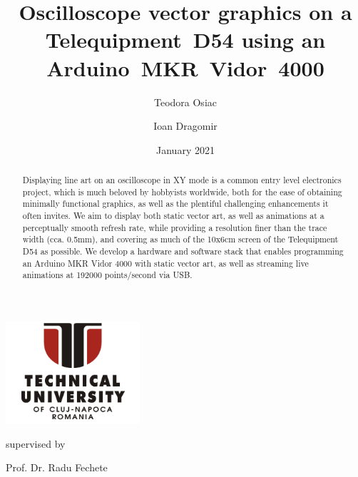\documentclass[12pt]{article}
\title{Oscilloscope vector graphics on a \mbox{Telequipment D54} using an \mbox{Arduino MKR Vidor 4000}}
\author{Teodora Osiac \and Ioan Dragomir}
\date{January 2021}
\begin{document}
\makeatletter
\renewcommand{\and}{\quad}
\begin{titlepage}
	\vspace*{\fill}
	\centering

	\makeatletter
	\centering{\LARGE\bfseries \@title \par} \vspace{1.5cm}

	\includegraphics[height=1.5in]{images/tucn-logo.jpg}\par

	\vspace{1.5cm}
	{\Large\@author \par}\vspace{0.45cm}

	{\large supervised by\par
	Prof. Dr. Radu Fechete}

	\vspace*{\fill}
	{\large \@date\par}
\end{titlepage}
\makeatother

\begin{abstract}
\noindent Displaying line art on an oscilloscope in XY mode is a common entry level electronics project, which is much beloved by hobbyists worldwide, both for the ease of obtaining minimally functional graphics, as well as the plentiful challenging enhancements it often invites. We aim to display both static vector art, as well as animations at a perceptually smooth refresh rate, while providing a resolution finer than the trace width (cca. 0.5mm), and covering as much of the 10x6cm screen of the Telequipment D54 as possible. We develop a hardware and software stack that enables programming an Arduino MKR Vidor 4000 with static vector art, as well as streaming live animations at 192000 points/second via USB.

\end{abstract}

\tableofcontents

\newpage

\end{document}
